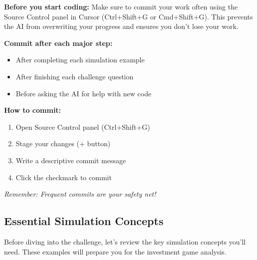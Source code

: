 \documentclass[
  letterpaper,
  DIV=11,
  numbers=noendperiod]{scrartcl}
\providecommand{\tightlist}{%
  \setlength{\itemsep}{0pt}\setlength{\parskip}{0pt}}
\theoremstyle{definition}
\theoremstyle{remark}
\begin{document}
\begin{tcolorbox}[enhanced jigsaw, rightrule=.15mm, leftrule=.75mm, toptitle=1mm, bottomtitle=1mm, title=\textcolor{quarto-callout-warning-color}{\faExclamationTriangle}\hspace{0.5em}{💾 Important: Save Your Work Frequently!}, opacityback=0, colbacktitle=quarto-callout-warning-color!10!white, arc=.35mm, coltitle=black, colback=white, breakable, titlerule=0mm, colframe=quarto-callout-warning-color-frame, toprule=.15mm, bottomrule=.15mm, left=2mm, opacitybacktitle=0.6]

\textbf{Before you start coding:} Make sure to commit your work often
using the Source Control panel in Cursor (Ctrl+Shift+G or Cmd+Shift+G).
This prevents the AI from overwriting your progress and ensures you
don't lose your work.

\textbf{Commit after each major step:}

\begin{itemize}
\tightlist
\item
  After completing each simulation example
\item
  After finishing each challenge question
\item
  Before asking the AI for help with new code
\end{itemize}

\textbf{How to commit:}

\begin{enumerate}
\def\labelenumi{\arabic{enumi}.}
\tightlist
\item
  Open Source Control panel (Ctrl+Shift+G)
\item
  Stage your changes (+ button)
\item
  Write a descriptive commit message
\item
  Click the checkmark to commit
\end{enumerate}

\emph{Remember: Frequent commits are your safety net!}

\end{tcolorbox}

\subsection{Essential Simulation Concepts
🎯}\label{sec-simulation-concepts}

Before diving into the challenge, let's review the key simulation
concepts you'll need. These examples will prepare you for the investment
game analysis.
\end{document}
